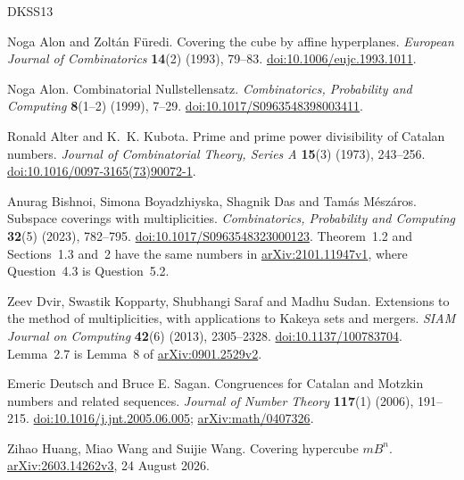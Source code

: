 \begin{thebibliography}{DKSS13}
\small
\setlength{\itemsep}{3pt}
\raggedright

Noga Alon and Zolt\'an F\"uredi.
\newblock Covering the cube by affine hyperplanes.
\newblock \emph{European Journal of Combinatorics} \textbf{14}(2)
(1993), 79--83.
\newblock \href{https://doi.org/10.1006/eujc.1993.1011}{doi:10.1006/eujc.1993.1011}.

Noga Alon.
\newblock Combinatorial Nullstellensatz.
\newblock \emph{Combinatorics, Probability and Computing} \textbf{8}(1--2)
(1999), 7--29.
\newblock \href{https://doi.org/10.1017/S0963548398003411}{doi:10.1017/S0963548398003411}.

Ronald Alter and K.~K. Kubota.
\newblock Prime and prime power divisibility of Catalan numbers.
\newblock \emph{Journal of Combinatorial Theory, Series A} \textbf{15}(3) (1973),
243--256.
\newblock \href{https://doi.org/10.1016/0097-3165(73)90072-1}{doi:10.1016/0097-3165(73)90072-1}.

Anurag Bishnoi, Simona Boyadzhiyska, Shagnik Das and Tam\'as M\'esz\'aros.
\newblock Subspace coverings with multiplicities.
\newblock \emph{Combinatorics, Probability and Computing} \textbf{32}(5)
(2023), 782--795.
\newblock \href{https://doi.org/10.1017/S0963548323000123}{doi:10.1017/S0963548323000123}.
Theorem~1.2 and Sections~1.3 and~2 have the same numbers in
\href{https://arxiv.org/abs/2101.11947v1}{arXiv:2101.11947v1}, where Question~4.3 is
Question~5.2.

Zeev Dvir, Swastik Kopparty, Shubhangi Saraf and Madhu Sudan.
\newblock Extensions to the method of multiplicities, with applications to
Kakeya sets and mergers.
\newblock \emph{SIAM Journal on Computing} \textbf{42}(6) (2013), 2305--2328.
\newblock \href{https://doi.org/10.1137/100783704}{doi:10.1137/100783704}.
Lemma~2.7 is Lemma~8 of \href{https://arxiv.org/abs/0901.2529v2}{arXiv:0901.2529v2}.

Emeric Deutsch and Bruce E. Sagan.
\newblock Congruences for Catalan and Motzkin numbers and related sequences.
\newblock \emph{Journal of Number Theory} \textbf{117}(1) (2006), 191--215.
\newblock \href{https://doi.org/10.1016/j.jnt.2005.06.005}{doi:10.1016/j.jnt.2005.06.005};
\href{https://arxiv.org/abs/math/0407326}{arXiv:math/0407326}.

Zihao Huang, Miao Wang and Suijie Wang.
\newblock Covering hypercube \(mB^n\).
\newblock \href{https://arxiv.org/abs/2603.14262v3}{arXiv:2603.14262v3},
24 August 2026.


\end{thebibliography}
